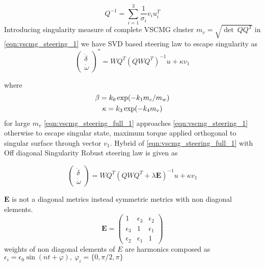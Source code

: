  
\begin{equation}
Q^{-1} =\sum ^{3}_{i=1}\frac{1}{\sigma _{i}} v_{i} u^{T}_{i}
\end{equation}
Introducing singularity measure of complete VSCMG cluster $\displaystyle m_{v} =\sqrt{\det \ QQ^{T}}$ in \autoref{eqn:vscmg_steering_1} we have SVD based steering law to escape singularity as
\begin{equation}
\begin{pmatrix}
\dot{\delta }\\
\dot{\omega }
\end{pmatrix}^{*} =WQ^{T}\left( QWQ^{T}\right)^{-1} u+\kappa v_{1}
\label{eqn:vscmg_steering_full_1}
\end{equation}

where 
\begin{gather}
\beta =k_{0}\exp( -k_{1} m_{c} /m_{w}) \notag\\
\kappa =k_{3}\exp( -k_{4} m_{v})
\end{gather}
for large $\displaystyle m_{v}$ \autoref{eqn:vscmg_steering_full_1} approaches \autoref{eqn:vscmg_steering_1} otherwise to escape singular state, maximum torque applied orthogonal to singular surface through vector $\displaystyle v_{1}$.
Hybrid of \autoref{eqn:vscmg_steering_full_1} with Off diagonal Singularity Robust steering law is given as
\begin{tcolorbox}
\begin{equation}
\begin{pmatrix}
\dot{\delta }\\
\dot{\omega }
\end{pmatrix} =WQ^{T}\left( QWQ^{T} +\lambda \mathbf{E}\right)^{-1} u+\kappa v_{1}
\label{eqn:vscmg_steering_full_HSR}
\end{equation}
\end{tcolorbox}

$\textbf{E}$ is not a diagonal metrics instead symmetric metrics with non diagonal elements.
\begin{equation}
\mathbf{E} =\begin{pmatrix}
1 & \epsilon _{3} & \epsilon _{2}\\
\epsilon _{3} & 1 & \epsilon _{1}\\
\epsilon _{2} & \epsilon _{1} &  1
\end{pmatrix}
\end{equation}
weights of non diagonal elements of $E$ are harmonics composed as
$\displaystyle \epsilon _{i} =\epsilon _{0}\sin( nt+\varphi ) ,\ \varphi _{i} =\{0,\pi /2,\pi \}$ 